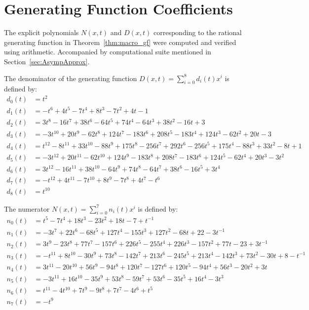 \documentclass[11pt]{article}
\begin{document}
\appendix
\section{Generating Function Coefficients}\label{app:gf}

The explicit polynomials $N(x,t)$ and $D(x,t)$ corresponding to the rational generating function in Theorem~\ref{thm:macro_gf} were computed and verified using arithmetic. Accompanied by computational suite mentioned in Section~\ref{sec:AsympApprox}.

The denominator of the generating function $D(x,t) = \sum_{i=0}^8 d_i(t) x^i$ is defined by:
\begin{align*}
d_0(t) &= t^2 \\
d_1(t) &= -t^6 + 4t^5 - 7t^4 + 8t^3 - 7t^2 + 4t - 1 \\
d_2(t) &= 3t^8 - 16t^7 + 38t^6 - 64t^5 + 74t^4 - 64t^3 + 38t^2 - 16t + 3 \\
d_3(t) &= -3t^{10} + 20t^9 - 62t^8 + 124t^7 - 183t^6 + 208t^5 - 183t^4 + 124t^3 - 62t^2 + 20t - 3 \\
d_4(t) &= t^{12} - 8t^{11} + 33t^{10} - 88t^9 + 175t^8 - 256t^7 + 292t^6 - 256t^5 + 175t^4 - 88t^3 + 33t^2 - 8t + 1 \\
d_5(t) &= -3t^{12} + 20t^{11} - 62t^{10} + 124t^9 - 183t^8 + 208t^7 - 183t^6 + 124t^5 - 62t^4 + 20t^3 - 3t^2 \\
d_6(t) &= 3t^{12} - 16t^{11} + 38t^{10} - 64t^9 + 74t^8 - 64t^7 + 38t^6 - 16t^5 + 3t^4 \\
d_7(t) &= -t^{12} + 4t^{11} - 7t^{10} + 8t^9 - 7t^8 + 4t^7 - t^6 \\
d_8(t) &= t^{10}
\end{align*}

The numerator $N(x,t) = \sum_{i=0}^7 n_i(t) x^i$ is defined by:
\begin{align*}
n_0(t) &= t^5 - 7t^4 + 18t^3 - 23t^2 + 18t - 7 + t^{-1} \\
n_1(t) &= -3t^7 + 22t^6 - 68t^5 + 127t^4 - 155t^3 + 127t^2 - 68t + 22 - 3t^{-1} \\
n_2(t) &= 3t^9 - 23t^8 + 77t^7 - 157t^6 + 226t^5 - 255t^4 + 226t^3 - 157t^2 + 77t - 23 + 3t^{-1} \\
n_3(t) &= -t^{11} + 8t^{10} - 30t^9 + 73t^8\! - 142t^7 + 213t^6 \!- 245t^5 \!+ 213t^4 \!- 142t^3 + 73t^2 - 30t + 8 - t^{-1} \\
n_4(t) &= 3t^{11} - 20t^{10} + 56t^9 - 94t^8 + 120t^7 - 127t^6 + 120t^5 - 94t^4 + 56t^3 - 20t^2 + 3t \\
n_5(t) &= -3t^{11} + 16t^{10} - 35t^9 + 53t^8 - 59t^7 + 53t^6 - 35t^5 + 16t^4 - 3t^3 \\
n_6(t) &= t^{11} - 4t^{10} + 7t^9 - 9t^8 + 7t^7 - 4t^6 + t^5 \\
n_7(t) &= -t^9
\end{align*}
\end{document}
